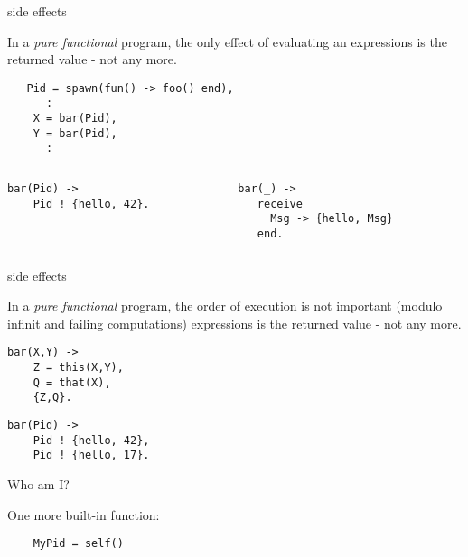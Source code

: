 \begin{frame}[fragile]{side effects}

In a {\em pure functional} program, the only effect of evaluating an
expressions is the returned value \pause - not any more.

\pause\vspace{10pt}
\begin{verbatim}
   Pid = spawn(fun() -> foo() end),
      :
    X = bar(Pid),
    Y = bar(Pid),
      :
\end{verbatim}

\pause\vspace{10pt}

\begin{columns}
  \begin{column}{0.5\linewidth}
\begin{verbatim}
bar(Pid) ->
    Pid ! {hello, 42}.
\end{verbatim}
  \end{column}
  \pause
  \begin{column}{0.5\linewidth}
\begin{verbatim}
bar(_) ->
   receive 
     Msg -> {hello, Msg}
   end.
\end{verbatim}
 \end{column}
\end{columns}  

\end{frame}


\begin{frame}[fragile]{side effects}

In a {\em pure functional} program, the order of execution is not important (modulo infinit and failing computations)
expressions is the returned value \pause - not any more.

\pause\vspace{10pt}
\begin{verbatim}
bar(X,Y) ->
    Z = this(X,Y),
    Q = that(X),
    {Z,Q}.
\end{verbatim}

\pause\vspace{10pt}

\begin{verbatim}
bar(Pid) ->
    Pid ! {hello, 42},
    Pid ! {hello, 17}.
\end{verbatim}

\end{frame}

 
\begin{frame}[fragile]{Who am I?}

One more built-in function:

\pause\vspace{10pt}

\begin{verbatim}
    MyPid = self()
\end{verbatim}

\end{frame}

